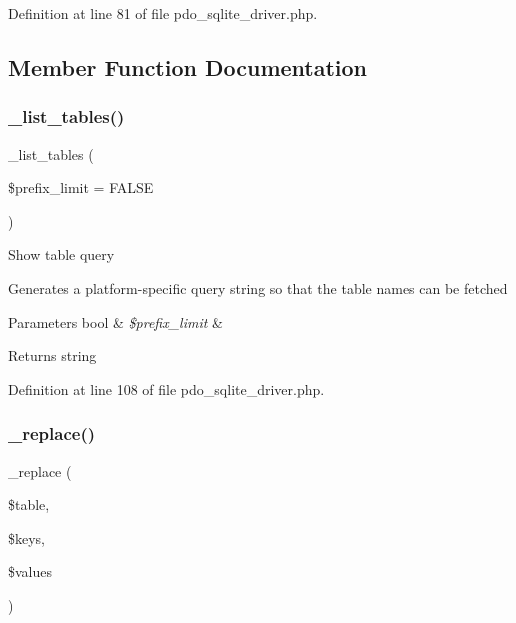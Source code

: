 Definition at line 81 of file pdo\+\_\+sqlite\+\_\+driver.\+php.



\subsection{Member Function Documentation}
\mbox{\label{class_c_i___d_b__pdo__sqlite__driver_a435c0f3ce54fe7daa178baa8532ebd54}} 
\subsubsection{\texorpdfstring{\_list\_tables()}{\_list\_tables()}}
{\footnotesize\ttfamily \+\_\+list\+\_\+tables (\begin{DoxyParamCaption}\item[{}]{\$prefix\+\_\+limit = {\ttfamily FALSE} }\end{DoxyParamCaption})\hspace{0.3cm}{\ttfamily [protected]}}

Show table query

Generates a platform-\/specific query string so that the table names can be fetched


\begin{DoxyParams}[1]{Parameters}
bool & {\em \$prefix\+\_\+limit} & \\
\hline
\end{DoxyParams}
\begin{DoxyReturn}{Returns}
string 
\end{DoxyReturn}


Definition at line 108 of file pdo\+\_\+sqlite\+\_\+driver.\+php.

\mbox{\label{class_c_i___d_b__pdo__sqlite__driver_ae0adf73984daf2d42ad29b66c484c82b}} 
\subsubsection{\texorpdfstring{\_replace()}{\_replace()}}
{\footnotesize\ttfamily \+\_\+replace (\begin{DoxyParamCaption}\item[{}]{\$table,  }\item[{}]{\$keys,  }\item[{}]{\$values }\end{DoxyParamCaption})\hspace{0.3cm}{\ttfamily [protected]}}

